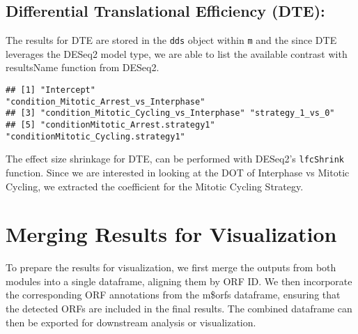 \documentclass[
]{article}
\newenvironment{Shaded}{\begin{snugshade}}{\end{snugshade}}
\newcommand{\AttributeTok}[1]{\textcolor[rgb]{0.13,0.29,0.53}{#1}}
\newcommand{\FunctionTok}[1]{\textcolor[rgb]{0.13,0.29,0.53}{\textbf{#1}}}
\newcommand{\NormalTok}[1]{#1}
\newcommand{\OtherTok}[1]{\textcolor[rgb]{0.56,0.35,0.01}{#1}}
\newcommand{\SpecialCharTok}[1]{\textcolor[rgb]{0.81,0.36,0.00}{\textbf{#1}}}
\newcommand{\StringTok}[1]{\textcolor[rgb]{0.31,0.60,0.02}{#1}}
\begin{document}
\subsection{Differential Translational Efficiency
(DTE):}\label{differential-translational-efficiency-dte}

The results for DTE are stored in the \texttt{dds} object within
\texttt{m} and the since DTE leverages the DESeq2 model type, we are
able to list the available contrast with resultsName function from
DESeq2.

\begin{Shaded}
\end{Shaded}

\begin{verbatim}
## [1] "Intercept"                               "condition_Mitotic_Arrest_vs_Interphase" 
## [3] "condition_Mitotic_Cycling_vs_Interphase" "strategy_1_vs_0"                        
## [5] "conditionMitotic_Arrest.strategy1"       "conditionMitotic_Cycling.strategy1"
\end{verbatim}

The effect size shrinkage for DTE, can be performed with DESeq2's
\texttt{lfcShrink} function. Since we are interested in looking at the
DOT of Interphase vs Mitotic Cycling, we extracted the coefficient for
the Mitotic Cycling Strategy.

\begin{Shaded}
\end{Shaded}

\section{Merging Results for
Visualization}\label{merging-results-for-visualization}

To prepare the results for visualization, we first merge the outputs
from both modules into a single dataframe, aligning them by ORF ID. We
then incorporate the corresponding ORF annotations from the m\$orfs
dataframe, ensuring that the detected ORFs are included in the final
results. The combined dataframe can then be exported for downstream
analysis or visualization.
\end{document}
